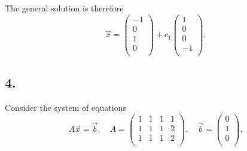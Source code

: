 The general solution is therefore
\[ 
\Vec{x} = \begin{pmatrix}
-1\\
0\\
1\\
0\\
\end{pmatrix} + c_1 \begin{pmatrix}
1\\
0\\
0\\
-1\\
\end{pmatrix}
.\]


\subsection*{4.}
Consider the system of equations
\[ 
A \Vec{x} = \Vec{b}, \quad A = \begin{pmatrix}
1 & 1 & 1 & 1\\
1 & 1 & 1 & 2\\
1 & 1 & 1 & 2\\
\end{pmatrix}, \quad \Vec{b} = \begin{pmatrix}
0\\
1\\
0\\
\end{pmatrix}
.\]

